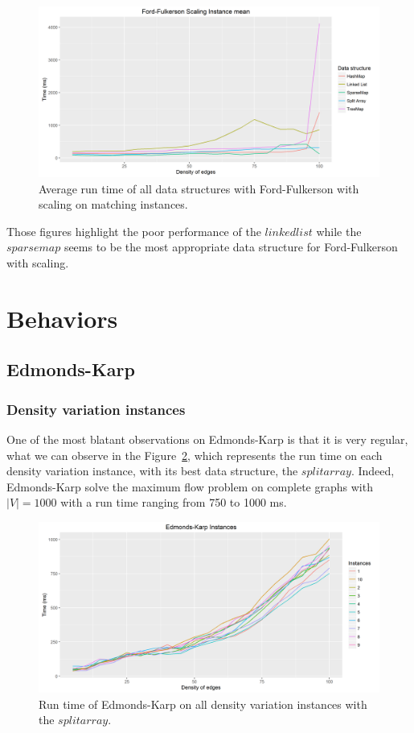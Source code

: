\begin{figure}[H]
\begin{center}
\includegraphics[scale=0.5]{images/ffmeanmatching2.png}
\caption{Average run time of all data structures with Ford-Fulkerson with scaling on matching instances.}
\label{fig:ffmeanmatching}
\end{center}
\end{figure}
Those figures highlight the poor performance of the $linked list$ while the $sparsemap$ seems to be the most appropriate data structure for Ford-Fulkerson with scaling.
\section{Behaviors}
\subsection{Edmonds-Karp}
\subsubsection{Density variation instances}
One of the most blatant observations on Edmonds-Karp is that it is very regular, what we can observe in the Figure~\ref{fig:EKmean}, which represents the run time on each density variation instance, with its best data structure, the $split array$. Indeed, Edmonds-Karp solve the maximum flow problem on complete graphs with $|V|=1000$ with a run time ranging from 750 to 1000 ms.
\begin{figure}[H]
\begin{center}
\includegraphics[scale=0.5]{images/EKmean.png}
\caption{Run time of Edmonds-Karp on all density variation instances with the $split array$.}
\label{fig:EKmean}
\end{center}
\end{figure}

